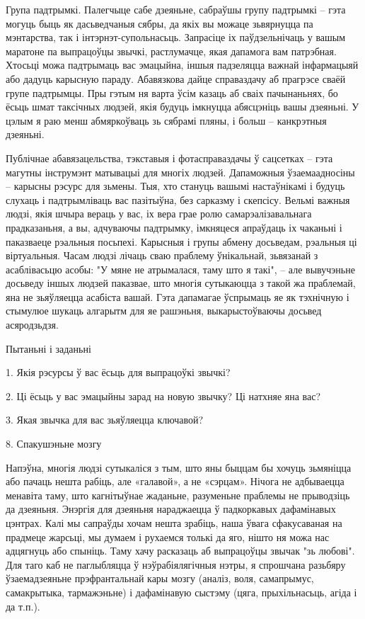 Група падтрымкі. Палегчыце сабе дзеяньне, сабраўшы групу падтрымкі – гэта могуць быць як дасьведчаныя сябры, да якіх вы можаце зьвярнуцца па мэнтарства, так і інтэрнэт-супольнасьць. Запрасіце іх паўдзельнічаць у вашым маратоне па выпрацоўцы звычкі, растлумачце, якая дапамога вам патрэбная. Хтосьці можа падтрымаць вас эмацыйна, іншыя падзеляцца важнай інфармацыяй або дадуць карысную параду. Абавязкова дайце справаздачу аб прагрэсе сваёй групе падтрымцы. Пры гэтым ня варта ўсім казаць аб сваіх пачынаньнях, бо ёсьць шмат таксічных людзей, якія будуць імкнуцца абясцэніць вашы дзеяньні. У цэлым я раю менш абмяркоўваць зь сябрамі пляны, і больш – канкрэтныя дзеяньні. 

Публічнае абавязацельства, тэкставыя і фотасправаздачы ў сацсетках – гэта магутны інструмэнт матывацыі для многіх людзей. Дапаможныя ўзаемаадносіны – карысны рэсурс для зьмены. Тыя, хто стануць вашымі настаўнікамі і будуць слухаць і падтрымліваць вас пазітыўна, без сарказму і скепсісу. Вельмі важныя людзі, якія шчыра вераць у вас, іх вера грае ролю самарэалізавальнага прадказаньня, а вы, адчуваючы падтрымку, імкняцеся апраўдаць іх чаканьні і паказваеце рэальныя посьпехі. Карысныя і групы абмену досьведам, рэальныя ці віртуальныя. Часам людзі лічаць сваю праблему ўнікальнай, зьвязанай з асаблівасьцю асобы: "У мяне не атрымалася, таму што я такі", – але вывучэньне досьведу іншых людзей паказвае, што многія сутыкаюцца з такой жа праблемай, яна не зьяўляецца асабіста вашай. Гэта дапамагае ўспрымаць яе як тэхнічную і стымулюе шукаць алгарытм для яе рашэньня, выкарыстоўваючы досьвед асяродзьдзя.

Пытаньні і заданьні

1. Якія рэсурсы ў вас ёсьць для выпрацоўкі звычкі?

2. Ці ёсьць у вас эмацыйны зарад на новую звычку? Ці натхняе яна вас?

3. Якая звычка для вас зьяўляецца ключавой?


8. Спакушэньне мозгу

Напэўна, многія людзі сутыкаліся з тым, што яны быццам бы хочуць зьмяніцца або пачаць нешта рабіць, але «галавой», а не «сэрцам». Нічога не адбываецца менавіта таму, што кагнітыўнае жаданьне, разуменьне праблемы не прыводзіць да дзеяньня. Энэргія для дзеяньня нараджаецца ў падкоркавых дафамінавых цэнтрах. Калі мы сапраўды хочам нешта зрабіць, наша ўвага сфакусаваная на прадмеце жарсьці, мы думаем і рухаемся толькі да яго, нішто ня можа нас адцягнуць або спыніць. Таму хачу расказаць аб выпрацоўцы звычак "зь любові". Для таго каб не паглыбляцца ў нэўрабіялягічныя нэтры, я спрошчана разьбяру ўзаемадзеяньне прэфрантальнай кары мозгу (аналіз, воля, самапрымус, самакрытыка, тармажэньне) і дафамінавую сыстэму (цяга, прыхільнасьць, агіда і да т.п.).

